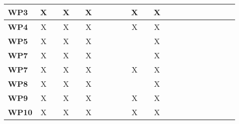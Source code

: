 \documentclass[12pt]{article}
\begin{document}
\begin{table}[H]
\begin{adjustwidth}{-0.8in}{-1.2in}
{\begin{tabular}{c|c|c|c|c|c|c|c|c|c|c|c|c|c|c|c|c|c|c|c|c|c}
\multicolumn{1}{|l|}{\textbf{WP3}}   &      X       &              &      X       &              &      X       &              &              &              &              &      X       &              &      X       &              &              &             &              &             &             &             &             \\ \hline
\multicolumn{1}{|l|}{\textbf{WP4}}   &      X       &              &      X       &              &      X       &              &              &              &              &      X       &              &      X       &              &              &             &              &             &             &             &             \\ \hline
\multicolumn{1}{|l|}{\textbf{WP5}}   &      X       &              &      X       &              &      X       &              &              &              &              &              &              &      X       &              &              &             &              &             &             &             &             \\ \hline
\multicolumn{1}{|l|}{\textbf{WP7}}   &      X       &              &      X       &              &      X       &              &              &              &              &              &              &      X       &              &              &             &              &             &             &             &             \\ \hline
\multicolumn{1}{|l|}{\textbf{WP7}}   &      X       &              &      X       &              &      X       &              &              &              &              &      X       &              &      X       &              &              &             &              &             &             &             &             \\ \hline
\multicolumn{1}{|l|}{\textbf{WP8}}   &      X       &              &      X       &              &      X       &              &              &              &              &              &              &      X       &              &              &             &              &             &             &             &             \\ \hline
\multicolumn{1}{|l|}{\textbf{WP9}}   &      X       &              &      X       &              &      X       &              &              &              &              &      X       &              &      X       &              &              &             &              &             &             &             &             \\ \hline
\multicolumn{1}{|l|}{\textbf{WP10}}  &      X       &              &      X       &              &      X       &              &              &              &              &      X       &              &      X       &              &              &             &              &             &             &             &             \\ \hline
\end{tabular}

}
\end{adjustwidth}
\end{table}
\end{document}
